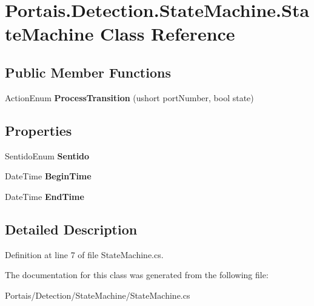 \hypertarget{class_portais_1_1_detection_1_1_state_machine_1_1_state_machine}{}\section{Portais.\+Detection.\+State\+Machine.\+State\+Machine Class Reference}
\label{class_portais_1_1_detection_1_1_state_machine_1_1_state_machine}
\subsection*{Public Member Functions}
\begin{DoxyCompactItemize}
\item 
Action\+Enum {\bfseries Process\+Transition} (ushort port\+Number, bool state)\hypertarget{class_portais_1_1_detection_1_1_state_machine_1_1_state_machine_adab1df73d5d5624eaabdd59854dd2d58}{}\label{class_portais_1_1_detection_1_1_state_machine_1_1_state_machine_adab1df73d5d5624eaabdd59854dd2d58}

\end{DoxyCompactItemize}
\subsection*{Properties}
\begin{DoxyCompactItemize}
\item 
Sentido\+Enum {\bfseries Sentido}\hypertarget{class_portais_1_1_detection_1_1_state_machine_1_1_state_machine_aaddb4c273938774ed3b1029e1b768aa7}{}\label{class_portais_1_1_detection_1_1_state_machine_1_1_state_machine_aaddb4c273938774ed3b1029e1b768aa7}

\item 
Date\+Time {\bfseries Begin\+Time}\hypertarget{class_portais_1_1_detection_1_1_state_machine_1_1_state_machine_ae7d66a6fc4b5f7d478aba62d99b32463}{}\label{class_portais_1_1_detection_1_1_state_machine_1_1_state_machine_ae7d66a6fc4b5f7d478aba62d99b32463}

\item 
Date\+Time {\bfseries End\+Time}\hypertarget{class_portais_1_1_detection_1_1_state_machine_1_1_state_machine_a420352c8aa21bc7e147817e0ccf68ecc}{}\label{class_portais_1_1_detection_1_1_state_machine_1_1_state_machine_a420352c8aa21bc7e147817e0ccf68ecc}

\end{DoxyCompactItemize}


\subsection{Detailed Description}


Definition at line 7 of file State\+Machine.\+cs.



The documentation for this class was generated from the following file\+:\begin{DoxyCompactItemize}
\item 
Portais/\+Detection/\+State\+Machine/State\+Machine.\+cs\end{DoxyCompactItemize}
